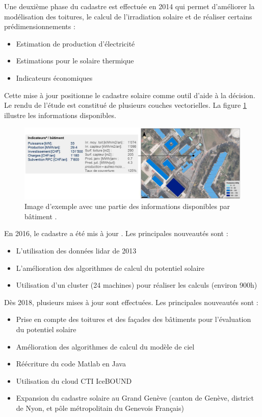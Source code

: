 \par{Une deuxième phase du cadastre est effectuée en 2014 \cite{desthieux_etude_2014} qui permet d'améliorer la modélisation des toitures, le calcul de l'irradiation solaire et de réaliser certains prédimensionnements :
\begin{itemize}
    \item Estimation de production d'électricité
    \item Estimations pour le solaire thermique
    \item Indicateurs économiques
\end{itemize}}
\par{Cette mise à jour positionne le cadastre solaire comme outil d'aide à la décision. Le rendu de l'étude est constitué de plusieurs couches vectorielles. La figure \ref{fig:cadastre_solaire_2014} illustre les informations disponibles.}
\begin{figure}[H]
    \centering
    \includegraphics[width=1\linewidth]{02-main//figures/cadastre_solaire_2014.png}
    \caption{Image d'exemple avec une partie des informations disponibles par bâtiment \cite{desthieux_etude_2014}.}
    \label{fig:cadastre_solaire_2014}
\end{figure}

\par{En 2016, le cadastre a été mis à jour \cite{desthieux_solar_2018}. Les principales nouveautés sont :
\begin{itemize}
    \item L'utilisation des données \gls{lidar} de 2013 \cite{sitg_nuages_2013}
    \item L'amélioration des algorithmes de calcul du potentiel solaire
    \item Utilisation d'un cluster (24 machines) pour réaliser les calculs (environ 900h)
\end{itemize}}

\par{Dès 2018, plusieurs mises à jour \cite{desthieux_solar_2018} sont effectuées. Les principales nouveautés sont :
\begin{itemize}
    \item Prise en compte des toitures et des façades des bâtiments pour l'évaluation du potentiel solaire
    \item Amélioration des algorithmes de calcul du modèle de ciel
    \item Réécriture du code Matlab en Java
    \item Utilisation du cloud CTI IceBOUND
    \item Expansion du cadastre solaire au Grand Genève (canton de Genève, district de Nyon, et pôle métropolitain du Genevois Français)
\end{itemize}}

